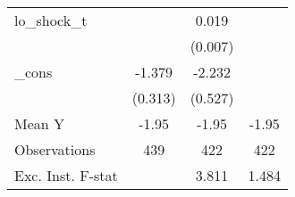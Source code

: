 {\begin{tabular}{l*{3}{c}}
\addlinespace
lo\_shock\_t  &                     &       0.019\sym{**} &                     \\
            &                     &     (0.007)         &                     \\
\addlinespace
\_cons      &      -1.379\sym{***}&      -2.232\sym{***}&                     \\
            &     (0.313)         &     (0.527)         &                     \\
\midrule
Mean Y      &       -1.95         &       -1.95         &       -1.95         \\
Observations&         439         &         422         &         422         \\
Exc. Inst. F-stat&                     &       3.811         &       1.484         \\
\bottomrule
\end{tabular}
}
